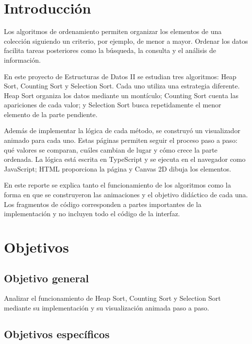 \documentclass[12pt,a4paper]{article}
\begin{document}
\section{Introducción}

Los algoritmos de ordenamiento permiten organizar los elementos de una colección siguiendo un criterio, por ejemplo, de menor a mayor. Ordenar los datos facilita tareas posteriores como la búsqueda, la consulta y el análisis de información.

En este proyecto de Estructuras de Datos II se estudian tres algoritmos: Heap Sort, Counting Sort y Selection Sort. Cada uno utiliza una estrategia diferente. Heap Sort organiza los datos mediante un montículo; Counting Sort cuenta las apariciones de cada valor; y Selection Sort busca repetidamente el menor elemento de la parte pendiente.

Además de implementar la lógica de cada método, se construyó un visualizador animado para cada uno. Estas páginas permiten seguir el proceso paso a paso: qué valores se comparan, cuáles cambian de lugar y cómo crece la parte ordenada. La lógica está escrita en TypeScript y se ejecuta en el navegador como JavaScript; HTML proporciona la página y Canvas 2D dibuja los elementos.

En este reporte se explica tanto el funcionamiento de los algoritmos como la forma en que se construyeron las animaciones y el objetivo didáctico de cada una. Los fragmentos de código corresponden a partes importantes de la implementación y no incluyen todo el código de la interfaz.

\section{Objetivos}

\subsection{Objetivo general}

Analizar el funcionamiento de Heap Sort, Counting Sort y Selection Sort mediante su implementación y su visualización animada paso a paso.

\subsection{Objetivos específicos}
\end{document}
